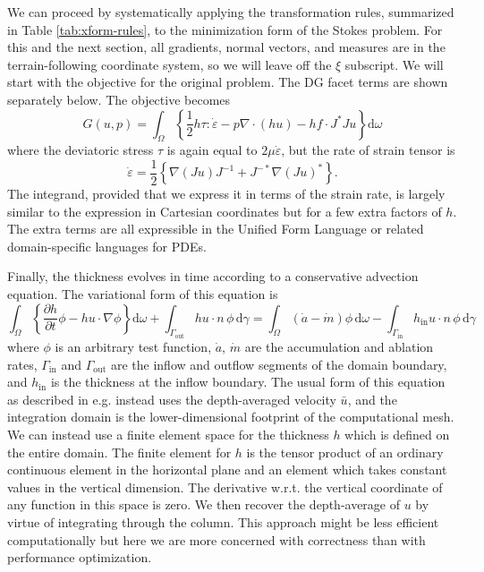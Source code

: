 \documentclass[gmd, manuscript]{copernicus}
\begin{document}
We can proceed by systematically applying the transformation rules, summarized in Table \ref{tab:xform-rules}, to the minimization form of the Stokes problem.
For this and the next section, all gradients, normal vectors, and measures are in the terrain-following coordinate system, so we will leave off the $\xi$ subscript.
We will start with the objective for the original problem.
The DG facet terms are shown separately below.
The objective becomes
\begin{equation}
    G(u, p) = \int_\Omega\left\{\frac{1}{2}h\tau :\dot\varepsilon - p\nabla\cdot(hu) - hf\cdot J^*J u\right\}\mathrm d\omega
    \label{eq:stokes-tfc}
\end{equation}
where the deviatoric stress $\tau$ is again equal to $2\mu\dot\varepsilon$, but the rate of strain tensor is
\begin{equation}
    \dot\varepsilon = \frac{1}{2}\left\{\nabla(Ju)J^{-1} + J^{-*}\nabla (Ju)^*\right\}.
    \label{eq:strain-rate-tfc}
\end{equation}
The integrand, provided that we express it in terms of the strain rate, is largely similar to the expression in Cartesian coordinates but for a few extra factors of $h$.
The extra terms are all expressible in the Unified Form Language or related domain-specific languages for PDEs.

Finally, the thickness evolves in time according to a conservative advection equation.
The variational form of this equation is
\begin{equation}
    \int_\Omega\left\{\frac{\partial h}{\partial t}\phi - hu\cdot\nabla\phi\right\}\mathrm d\omega + \int_{\Gamma_\text{out}}hu\cdot n\,\phi\,\mathrm{d}\gamma = \int_\Omega(\dot a - \dot m)\phi\,\mathrm{d}\omega - \int_{\Gamma_{\text{in}}}h_\text{in}u\cdot n\,\phi\,\mathrm{d}\gamma
\end{equation}
where $\phi$ is an arbitrary test function, $\dot a$, $\dot m$ are the accumulation and ablation rates, $\Gamma_\text{in}$ and $\Gamma_\text{out}$ are the inflow and outflow segments of the domain boundary, and $h_\text{in}$ is the thickness at the inflow boundary.
The usual form of this equation as described in e.g. \citet{greve2009dynamics} instead uses the depth-averaged velocity $\bar u$, and the integration domain is the lower-dimensional footprint of the computational mesh.
We can instead use a finite element space for the thickness $h$ which is defined on the entire domain.
The finite element for $h$ is the tensor product of an ordinary continuous element in the horizontal plane and an element which takes constant values in the vertical dimension.
The derivative w.r.t. the vertical coordinate of any function in this space is zero.
We then recover the depth-average of $u$ by virtue of integrating through the column.
This approach might be less efficient computationally but here we are more concerned with correctness than with performance optimization.
\end{document}
